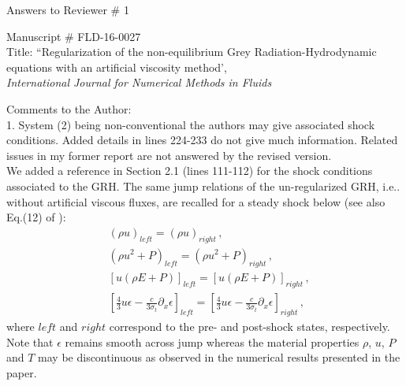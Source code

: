 \documentclass{article}
\begin{document}
\begin{center}
{ \Large Answers to Reviewer \# 1}
\end{center}

\bigskip

\noindent Manuscript \# FLD-16-0027 \\
Title: ``Regularization of the non-equilibrium Grey Radiation-Hydrodynamic equations with an artificial viscosity method', \\
{\it International Journal for Numerical Methods in Fluids}\\

\bigskip

{\color{blue}
Comments to the Author: \\ 
1. System (2) being non-conventional the authors may give associated shock conditions. Added details in lines 224-233 do not give much information. Related issues in my former report are not answered by the revised version.\\}
We added a reference in Section 2.1 (lines 111-112) for the shock conditions associated to the GRH. The same jump relations of the un-regularized GRH, i.e.. without artificial viscous fluxes, are recalled for a steady shock below 
(see also Eq.(12) of \cite{LowrieEdwards}):
%
\begin{eqnarray}\label{eq:jump-relations}
& (\rho u )_{left} = (\rho u )_{right} \, , \nonumber \\
& (\rho u^2 + P )_{left} = (\rho u^2 + P )_{right} \, , \nonumber \\
& \left[ u(\rho E + P )\right]_{left} = \left[ u(\rho E + P )\right]_{right} \, , \nonumber \\
& \left[ \frac{4}{3}u \epsilon - \frac{c}{3\sigma_t} \partial_x \epsilon \right]_{left} = \left[ \frac{4}{3}u \epsilon - \frac{c}{3\sigma_t} \partial_x \epsilon \right]_{right} \, , \nonumber
\end{eqnarray}
%
where $left$ and $right$ correspond to the pre- and post-shock states, respectively. Note that $\epsilon$ remains smooth across jump whereas the material properties $\rho$, $u$, $P$ and $T$ may be discontinuous as observed in the numerical results presented in the paper.

\bigskip
\end{document}
